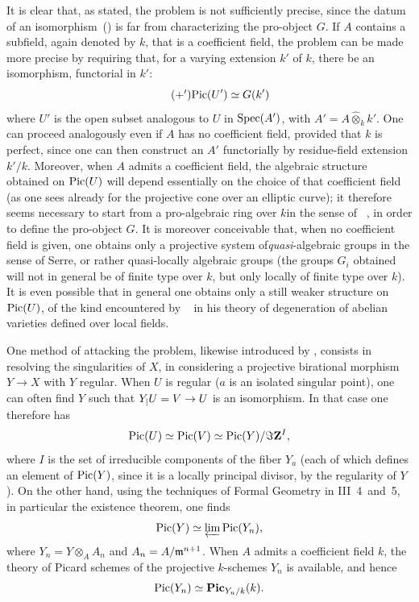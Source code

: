 It is clear that, as stated, the problem is not sufficiently precise, since the datum of an isomorphism~() is far from characterizing the pro-object $G$. If $A$ contains a subfield, again denoted by $k$, that is a coefficient field, the problem can be made more precise by requiring that, for a varying extension $k'$ of $k$, there be an isomorphism, functorial in $k'$:
\begin{equation*} \label{eq:XIII.5.+'} \tag{$+'$} {\Pic(U')\simeq G(k')} \end{equation*}
where $U'$ is the open subset analogous to $U$ in $\Spec(A')$, with $A'=A\hat{\otimes}_k k'$. One can proceed analogously even if $A$ has no coefficient field, provided that $k$ is perfect, since one can then construct an $A'$ functorially \og by residue-field extension $k'/k$\fg. Moreover, when $A$ admits a coefficient field, the algebraic structure obtained on $\Pic(U)$ will depend essentially on the choice of that coefficient field (as one sees already for the projective cone over an elliptic curve); it therefore seems necessary to start from a \og pro-algebraic ring over $k$\fg in the sense of ~\cite{XIII.3}, in order to define the pro-object $G$. It is moreover conceivable that, when no coefficient field is given, one obtains only a projective system of\pageoriginaled \emph{quasi}-algebraic groups in the sense of Serre, or rather quasi-locally algebraic groups (the groups $G_i$ obtained will not in general be of finite type over $k$, but only locally of finite type over $k$). It is even possible that in general one obtains only a still weaker structure on $\Pic(U)$, of the kind encountered by ~\cite{XIII.6} in his theory of degeneration of abelian varieties defined over local fields.

One method of attacking the problem, likewise introduced by , consists in resolving the singularities of $X$, \ie in considering a projective birational morphism $Y\to X$ with $Y$ regular. When $U$ is regular (\ie $a$ is an isolated singular point), one can often find $Y$ such that $Y\sisi{|U}{_|U}=V\to U$ is an isomorphism. In that case one therefore has
$$
\Pic(U)\simeq\Pic(V)\simeq\Pic(Y)/\Im \ZZ^I,
$$
where $I$ is the set of irreducible components of the fiber $Y_{a}$\sisi{, }{} (each of which defines an element of $\Pic(Y)$, since it is a locally principal divisor, by the regularity of $Y$). On the other hand, using the techniques of Formal Geometry in \EGA III~4~and~5, in particular the existence theorem, one finds
$$
\Pic(Y)\simeq\varprojlim\Pic(Y_n),
$$
where $Y_n=Y\otimes_A A_n$ and $A_n=A/\mm^{n+1}$. When $A$ admits a coefficient field $k$, the theory of Picard schemes of the projective $k$-schemes $Y_n$ is available, and hence
$$
\Pic(Y_n)\simeq \mathbf{Pic}_{Y_n/k}(k).
$$

